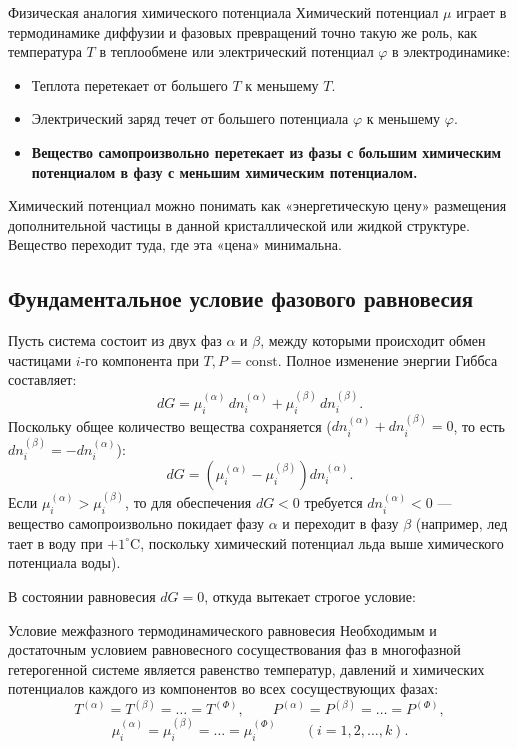 \documentclass[12pt,a4paper]{article}
\begin{document}
\begin{notebox}{Физическая аналогия химического потенциала}
Химический потенциал $\mu$ играет в термодинамике диффузии и фазовых превращений точно такую же роль, как температура $T$ в теплообмене или электрический потенциал $\varphi$ в электродинамике:
\begin{itemize}
    \item Теплота перетекает от большего $T$ к меньшему $T$.
    \item Электрический заряд течет от большего потенциала $\varphi$ к меньшему $\varphi$.
    \item \textbf{Вещество самопроизвольно перетекает из фазы с большим химическим потенциалом в фазу с меньшим химическим потенциалом.}
\end{itemize}
Химический потенциал можно понимать как «энергетическую цену» размещения дополнительной частицы в данной кристаллической или жидкой структуре. Вещество переходит туда, где эта «цена» минимальна.
\end{notebox}

\subsection{Фундаментальное условие фазового равновесия}
Пусть система состоит из двух фаз $\alpha$ и $\beta$, между которыми происходит обмен частицами $i$-го компонента при $T, P = \mathrm{const}$. Полное изменение энергии Гиббса составляет:
\begin{equation}
dG = \mu_i^{(\alpha)}\,dn_i^{(\alpha)} + \mu_i^{(\beta)}\,dn_i^{(\beta)}.
\end{equation}
Поскольку общее количество вещества сохраняется ($dn_i^{(\alpha)} + dn_i^{(\beta)} = 0$, то есть $dn_i^{(\beta)} = -dn_i^{(\alpha)}$):
\begin{equation}
dG = \left( \mu_i^{(\alpha)} - \mu_i^{(\beta)} \right) dn_i^{(\alpha)}.
\end{equation}
Если $\mu_i^{(\alpha)} > \mu_i^{(\beta)}$, то для обеспечения $dG < 0$ требуется $dn_i^{(\alpha)} < 0$ --- вещество самопроизвольно покидает фазу $\alpha$ и переходит в фазу $\beta$ (например, лед тает в воду при $+1^\circ\mathrm{C}$, поскольку химический потенциал льда выше химического потенциала воды). 

В состоянии равновесия $dG = 0$, откуда вытекает строгое условие:

\begin{lawbox}{Условие межфазного термодинамического равновесия}
Необходимым и достаточным условием равновесного сосуществования фаз в многофазной гетерогенной системе является равенство температур, давлений и химических потенциалов каждого из компонентов во всех сосуществующих фазах:
\begin{equation}
T^{(\alpha)} = T^{(\beta)} = \dots = T^{(\Phi)}, \qquad P^{(\alpha)} = P^{(\beta)} = \dots = P^{(\Phi)},
\end{equation}
\begin{equation}
\mu_i^{(\alpha)} = \mu_i^{(\beta)} = \dots = \mu_i^{(\Phi)} \qquad (i = 1, 2, \dots, k).
\label{eq:phase_equilibrium_condition}
\end{equation}
\end{lawbox}
\end{document}
